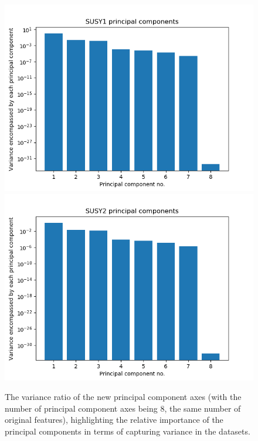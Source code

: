 \documentclass[prd,aps,letterpaper,floatfix,superscriptaddress,preprintnumbers,twocolumn,10pt,nofootinbib]{revtex4-1}
\begin{document}
\begin{figure} [H]
\includegraphics[scale=0.26]{figures/SUSY1_PCA.png}
\includegraphics[scale=0.26]{figures/SUSY2_PCA.png}
\caption{The   variance ratio of the new principal component axes (with the number of principal component axes being 8, the same number of original features), highlighting the relative importance of the principal components in terms of capturing variance in the datasets.}\label{PCA_plots2}
\end{figure}
\end{document}
